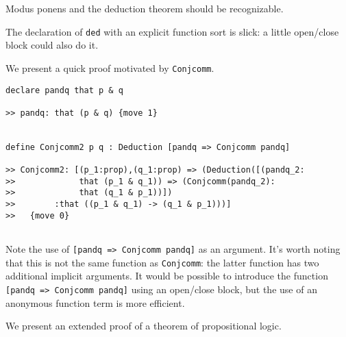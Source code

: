 \documentclass[12pt]{slides}
\begin{document}
\begin{slide}

Modus ponens and the deduction theorem should be recognizable.

The declaration of {\tt ded} with an explicit function sort is slick:  a little open/close block could also do it.

We present a quick proof motivated by {\tt Conjcomm}.

\begin{slide}
{\tiny
\begin{verbatim}
declare pandq that p & q

>> pandq: that (p & q) {move 1}


define Conjcomm2 p q : Deduction [pandq => Conjcomm pandq]

>> Conjcomm2: [(p_1:prop),(q_1:prop) => (Deduction([(pandq_2:
>>             that (p_1 & q_1)) => (Conjcomm(pandq_2):
>>             that (q_1 & p_1))])
>>        :that ((p_1 & q_1) -> (q_1 & p_1)))]
>>   {move 0}


\end{verbatim}
}
\end{slide}

Note the use of {\tt [pandq => Conjcomm pandq]} as an argument.  It's worth noting that this is not the same function as {\tt Conjcomm}:  the latter function has two additional implicit arguments.   It would be possible to introduce the function  {\tt [pandq => Conjcomm pandq]} using an open/close block, but the use of an anonymous function term is more efficient.

We present  an extended proof of a theorem of propositional logic.

\end{slide}
\end{document}
